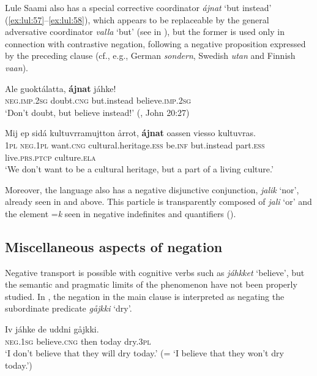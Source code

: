 \documentclass[output=paper,colorlinks,citecolor=brown]{langscibook}
\begin{document}
Lule Saami also has a special corrective coordinator \textit{ájnat} ‘but instead’ (\ref{ex:lul:57}--\ref{ex:lul:58}), which appears to be replaceable by the general adversative coordinator \textit{valla} ‘but’ (see  in ), but the former is used only in connection with contrastive negation, following a negative proposition expressed by the preceding clause (cf., e.g., German \textit{sondern}, Swedish \textit{utan} and Finnish \textit{vaan}).

\ea\label{ex:lul:57} 
    \gll Ale guoktálatta, \textbf{ájnat} jáhke! \\ 
         \textsc{neg.imp.2sg} doubt.\textsc{cng} but.instead believe.\textsc{imp.2sg} \\
    \glt ‘Don’t doubt, but believe instead!’ (\citealt{SIKOR2021}, John 20:27)
\z 

\ea\label{ex:lul:58} 
    \gll Mij ep sidá kultuvrramujtton årrot, \textbf{ájnat} oassen viesso kultuvras. \\ 
         \textsc{1pl} \textsc{neg.1pl} want.\textsc{cng} cultural.heritage.\textsc{ess} be.\textsc{inf}  but.instead part.\textsc{ess} live.\textsc{prs.ptcp} culture.\textsc{ela} \\
    \glt ‘We don’t want to be a cultural heritage, but a part of a living culture.’  \citep{SIKOR2021}
\z 

Moreover, the language also has a negative disjunctive conjunction, \textit{jalik} ‘nor’, already seen in  and  above. This particle is transparently composed of \textit{jali} ‘or’ and the element =\textit{k} seen in negative indefinites and quantifiers ().

\subsection{Miscellaneous aspects of negation}\label{sec:lul:4.6}

Negative transport is possible with cognitive verbs such as \textit{jáhkket} ‘believe’, but the semantic and pragmatic limits of the phenomenon have not been properly studied. In , the negation in the main clause is interpreted as negating the subordinate predicate \textit{gåjkki} ‘dry’.

\ea\label{ex:lul:59} 
    \gll Iv jáhke de uddni gåjkki. \\ 
         \textsc{neg.1sg} believe.\textsc{cng} then today dry.\textsc{3pl} \\
    \glt ‘I don’t believe that they will dry today.’ (= ‘I believe that they won’t dry today.’) \citep{SIKOR2021}
\z 
\end{document}
